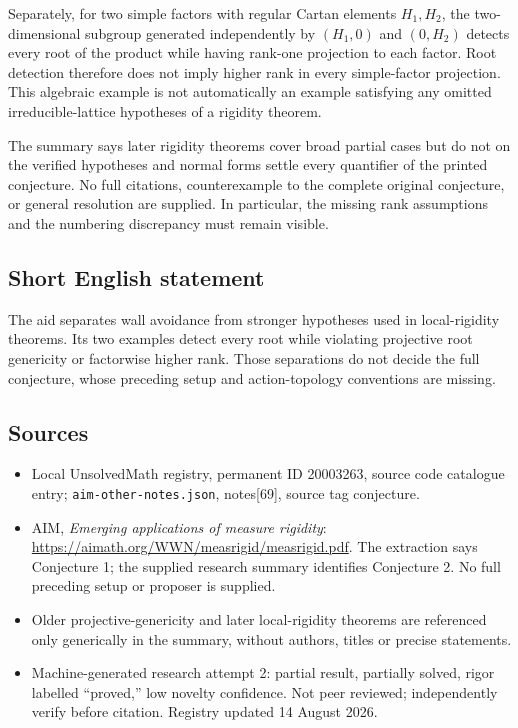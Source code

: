 \documentclass[11pt]{article}
\begin{document}
Separately, for two simple factors with regular Cartan elements $H_1,H_2$, the two-dimensional subgroup generated independently by $(H_1,0)$ and $(0,H_2)$ detects every root of the product while having rank-one projection to each factor. Root detection therefore does not imply higher rank in every simple-factor projection. This algebraic example is not automatically an example satisfying any omitted irreducible-lattice hypotheses of a rigidity theorem.

The summary says later rigidity theorems cover broad partial cases but do not on the verified hypotheses and normal forms settle every quantifier of the printed conjecture. No full citations, counterexample to the complete original conjecture, or general resolution are supplied. In particular, the missing rank assumptions and the numbering discrepancy must remain visible.
\subsection{Short English statement}
The aid separates wall avoidance from stronger hypotheses used in local-rigidity theorems. Its two examples detect every root while violating projective root genericity or factorwise higher rank. Those separations do not decide the full conjecture, whose preceding setup and action-topology conventions are missing.
\subsection{Sources}
\begin{itemize}
\item Local UnsolvedMath registry, permanent ID 20003263, source code catalogue entry; \texttt{aim-other-notes.json}, notes[69], source tag conjecture.
\item AIM, \emph{Emerging applications of measure rigidity}: \url{https://aimath.org/WWN/measrigid/measrigid.pdf}. The extraction says Conjecture 1; the supplied research summary identifies Conjecture 2. No full preceding setup or proposer is supplied.
\item Older projective-genericity and later local-rigidity theorems are referenced only generically in the summary, without authors, titles or precise statements.
\item Machine-generated research attempt 2: partial result, partially solved, rigor labelled ``proved,'' low novelty confidence. Not peer reviewed; independently verify before citation. Registry updated 14 August 2026.
\end{itemize}
\end{document}
